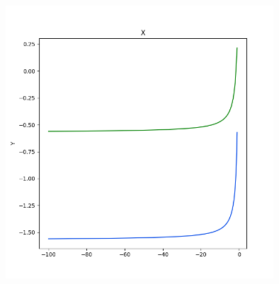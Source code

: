 \documentclass[a4paper]{article}
\begin{document}
\begin{lab1}
    \includegraphics[width=100mm,scale=0.5]{Figure_1.png}
    \end{lab1}    
    
\end{document}
